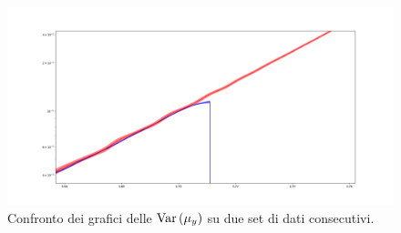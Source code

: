 \documentclass{article}[a4paper, oneside, 11pt]
\begin{document}
\begin{figure}[H]
	\centering 
 		\includegraphics[scale=0.32]{./comparison.png}
 	\caption{Confronto dei grafici delle $\text{Var}\left(\mu_y\right)$ su due set di
	dati consecutivi. \label{fig: comparison}}
\end{figure}

\end{document}
